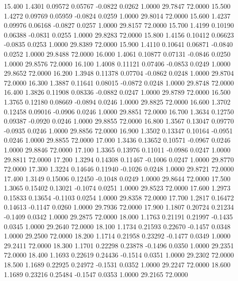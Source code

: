   15.400   1.4301   0.09572   0.05767  -0.0822   0.0262   1.0000  29.7847  72.0000
  15.500   1.4272   0.09769   0.05959  -0.0824   0.0259   1.0000  29.8014  72.0000
  15.600   1.4237   0.09976   0.06168  -0.0827   0.0257   1.0000  29.8157  72.0000
  15.700   1.4199   0.10190   0.06388  -0.0831   0.0255   1.0000  29.8283  72.0000
  15.800   1.4156   0.10412   0.06623  -0.0835   0.0253   1.0000  29.8389  72.0000
  15.900   1.4110   0.10641   0.06871  -0.0840   0.0252   1.0000  29.8488  72.0000
  16.000   1.4061   0.10877   0.07131  -0.0846   0.0250   1.0000  29.8576  72.0000
  16.100   1.4008   0.11121   0.07406  -0.0853   0.0249   1.0000  29.8652  72.0000
  16.200   1.3948   0.11378   0.07704  -0.0862   0.0248   1.0000  29.8704  72.0000
  16.300   1.3887   0.11641   0.08015  -0.0872   0.0248   1.0000  29.8748  72.0000
  16.400   1.3826   0.11908   0.08336  -0.0882   0.0247   1.0000  29.8789  72.0000
  16.500   1.3765   0.12180   0.08669  -0.0894   0.0246   1.0000  29.8825  72.0000
  16.600   1.3702   0.12458   0.09016  -0.0906   0.0246   1.0000  29.8851  72.0000
  16.700   1.3634   0.12750   0.09387  -0.0920   0.0246   1.0000  29.8855  72.0000
  16.800   1.3567   0.13047   0.09770  -0.0935   0.0246   1.0000  29.8856  72.0000
  16.900   1.3502   0.13347   0.10164  -0.0951   0.0246   1.0000  29.8855  72.0000
  17.000   1.3436   0.13652   0.10571  -0.0967   0.0246   1.0000  29.8846  72.0000
  17.100   1.3365   0.13976   0.11011  -0.0986   0.0247   1.0000  29.8811  72.0000
  17.200   1.3294   0.14308   0.11467  -0.1006   0.0247   1.0000  29.8770  72.0000
  17.300   1.3224   0.14646   0.11940  -0.1026   0.0248   1.0000  29.8721  72.0000
  17.400   1.3149   0.15006   0.12450  -0.1048   0.0249   1.0000  29.8644  72.0000
  17.500   1.3065   0.15402   0.13021  -0.1074   0.0251   1.0000  29.8523  72.0000
  17.600   1.2973   0.15833   0.13654  -0.1103   0.0254   1.0000  29.8358  72.0000
  17.700   1.2817   0.16472   0.14613  -0.1147   0.0260   1.0000  29.7936  72.0000
  17.900   1.1807   0.20724   0.21234  -0.1409   0.0342   1.0000  29.2875  72.0000
  18.000   1.1763   0.21191   0.21997  -0.1435   0.0345   1.0000  29.2640  72.0000
  18.100   1.1734   0.21593   0.22670  -0.1457   0.0348   1.0000  29.2500  72.0000
  18.200   1.1714   0.21958   0.23292  -0.1477   0.0349   1.0000  29.2411  72.0000
  18.300   1.1701   0.22298   0.23878  -0.1496   0.0350   1.0000  29.2351  72.0000
  18.400   1.1693   0.22619   0.24436  -0.1514   0.0351   1.0000  29.2302  72.0000
  18.500   1.1689   0.22925   0.24972  -0.1531   0.0352   1.0000  29.2247  72.0000
  18.600   1.1689   0.23216   0.25484  -0.1547   0.0353   1.0000  29.2165  72.0000

